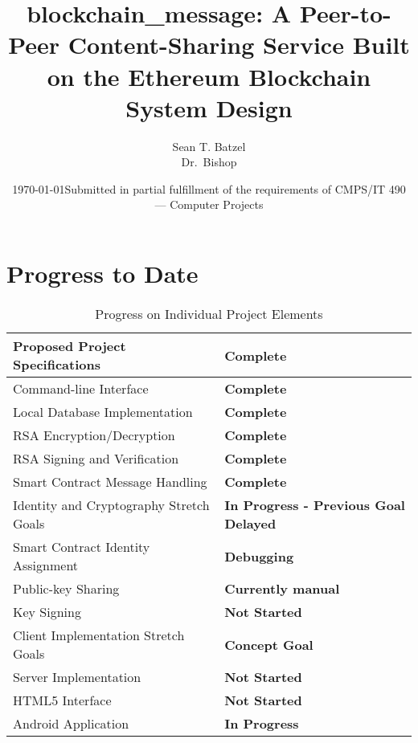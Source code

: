 \documentclass[titlepage]{report}
\title{blockchain\_message: A Peer-to-Peer Content-Sharing Service Built on the Ethereum Blockchain\\\large System Design}
\author{Sean T. Batzel\\Dr.\ Bishop}
\date{\today\endgraf\bigskip Submitted in partial fulfillment of the requirements of CMPS/IT 490 --- Computer Projects}
\begin{document}
\maketitle

\tableofcontents

\nocite{*}

\begin{abstract}

\end{abstract}

\pagebreak

\section{Progress to Date}

\begin{table}[ht]
\begin{center}
\caption{Progress on Individual Project Elements}
\begin{tabular}{| l | p{5cm} |}
\hline
Proposed Project Specifications & \textbf{Complete} \\
\hline
Command-line Interface & \textbf{Complete} \\
Local Database Implementation & \textbf{Complete} \\
RSA\index{RSA} Encryption/Decryption & \textbf{Complete} \\
RSA\index{RSA} Signing and Verification & \textbf{Complete} \\
Smart Contract Message Handling & \textbf{Complete} \\
\hline
Identity and Cryptography Stretch Goals & \textbf{In Progress - Previous Goal Delayed} \\
\hline
Smart Contract Identity Assignment & \textbf{Debugging} \\
Public-key Sharing & \textbf{Currently manual} \\
Key Signing & \textbf{Not Started} \\
\hline
Client Implementation Stretch Goals & \textbf{Concept Goal} \\
\hline
Server Implementation & \textbf{Not Started} \\
HTML5 Interface & \textbf{Not Started} \\
Android Application & \textbf{In Progress} \\
\hline
\end{tabular}
\end{center}
\end{table}

\listoftables
\listoffigures
\printindex
\printglossaries{}
\printbibliography{}
\end{document}
